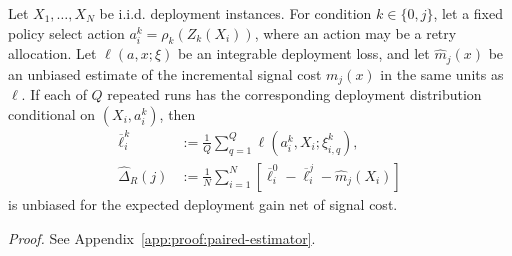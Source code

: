 \begin{proposition}
\label{prop:paired-unbiased}
Let $X_1,\ldots,X_N$ be i.i.d. deployment instances.  For condition
$k\in\{0,j\}$, let a fixed policy select action
$a_i^k=\rho_k(Z_k(X_i))$, where an action may be a retry allocation.  Let
$\ell(a,x;\xi)$ be an integrable deployment loss, and let
$\widehat m_j(x)$ be an unbiased estimate of the incremental signal cost
$m_j(x)$ in the same units as~$\ell$.  If each of $Q$ repeated runs has the
corresponding deployment distribution conditional on $(X_i,a_i^k)$, then
\begin{align*}
\overline\ell_i^k
&:=\frac1Q\sum_{q=1}^Q\ell(a_i^k,X_i;\xi_{i,q}^k),\\
\widehat\Delta_R(j)
&:=\frac1N\sum_{i=1}^N
\left[\overline\ell_i^0-\overline\ell_i^j-\widehat m_j(X_i)\right]
\end{align*}
is unbiased for the expected deployment gain net of signal cost.
\end{proposition}

\par\noindent\emph{Proof.} See Appendix~\ref{app:proof:paired-estimator}.\par
